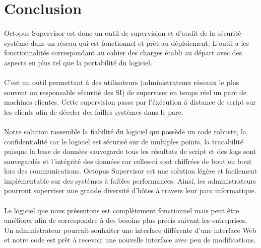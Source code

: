 \section*{Conclusion}
\paragraph{}
Octopus Supervisor est donc un outil de supervision et d'audit de la sécurité système dans un réseau qui est fonctionnel et prêt au déploiement. 
L'outil a les fonctionnalités correspondant au cahier des charges établi au départ avec des aspects en plus tel que la portabilité du logiciel.
\paragraph{}
C'est un outil permettant à des utilisateurs (administrateurs réseaux le plus souvent ou responsable sécurité des SI) de superviser en temps réel un parc de machines clientes. 
Cette supervision passe par l'éxécution à distance de script sur les clients afin de déceler des failles systèmes dans le parc.
\paragraph{}
Notre solution rassemble la fiabilité du logiciel qui possède un code robuste, la confidentialité car le logiciel est sécurisé sur de multiples points, la tracabilité puisque la base de données sauvegarde tous les résultats de script et des logs sont sauvegardés et l'intégrité des données car celles-ci sont chiffrées de bout en bout lors des communications.
Octopus Supervisor est une solution légère et facilement implémentable sur des systèmes à faibles performances. Ainsi, les administrateurs pourront superviser une grande diversité d'hôtes à travers leur parc informatique.
\paragraph{}
Le logiciel que nous présentons est complètement fonctionnel mais peut être améliorer afin de correspondre à des besoins plus précis suivant les entreprises. 
Un administrateur pourrait souhaiter une interface différente d'une interface Web et notre code est prêt à recevoir une nouvelle interface avec peu de modifications.